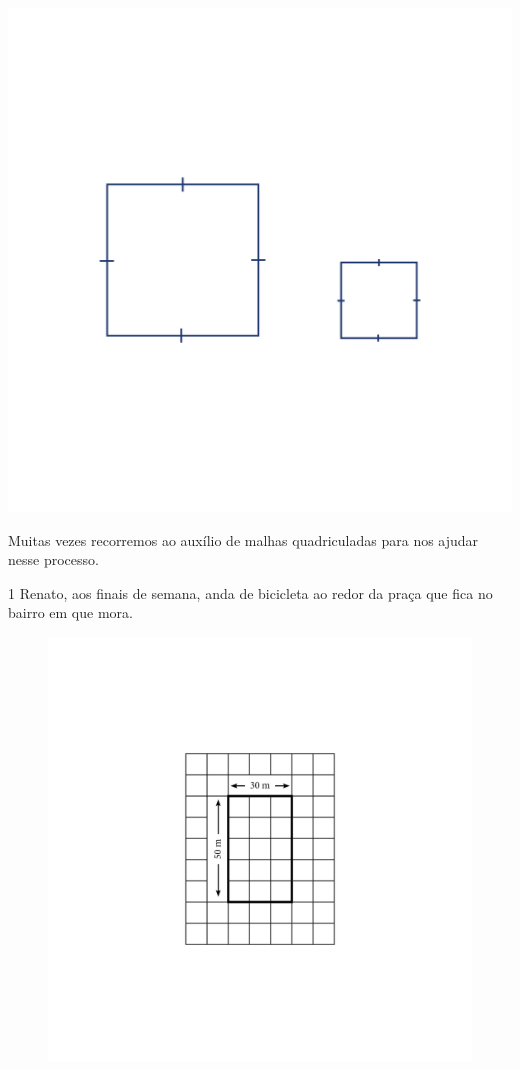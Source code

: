 {\includegraphics[width=\textwidth]{../ilustracoes/MAT5/SAEB_5ANO_MAT_figura34.png}

Muitas vezes recorremos ao auxílio de malhas quadriculadas para nos
ajudar nesse processo.}


\num{1} Renato, aos finais de semana, anda de bicicleta ao redor da praça
que fica no bairro em que mora.

\begin{figure}[htpb!]
\includegraphics[width=\textwidth]{../ilustracoes/MAT5/SAEB_5ANO_MAT_figura35.png}
\end{figure}

